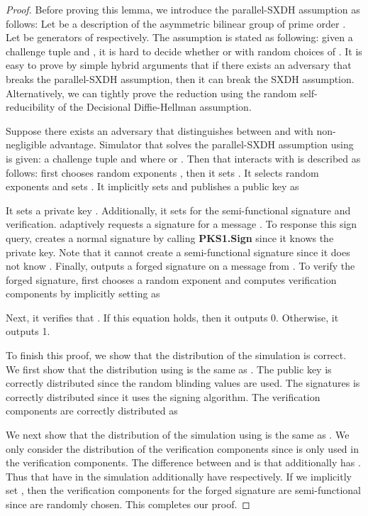 \documentclass[11pt,letterpaper]{article}
\newcommand{\vs}{\vspace{1.5mm}}
\begin{document}
\begin{proof}
Before proving this lemma, we introduce the parallel-SXDH assumption as
follows: Let  be a description of the asymmetric
bilinear group of prime order . Let  be generators of  respectively. The assumption is stated as following: given a
challenge tuple
     and ,
it is hard to decide whether  or  with random choices of . It is easy to prove by simple hybrid arguments that if there
exists an adversary that breaks the parallel-SXDH assumption, then it can
break the SXDH assumption. Alternatively, we can tightly prove the reduction
using the random self-reducibility of the Decisional Diffie-Hellman
assumption.

Suppose there exists an adversary  that distinguishes between
 and  with non-negligible advantage. Simulator 
that solves the parallel-SXDH assumption using  is given: a challenge
tuple
     and
     where
     or
    .
Then  that interacts with  is described as follows:
 first chooses random exponents , then it sets .
It selects random exponents  and sets
    .
It implicitly sets  and publishes a
public key  as
    
It sets a private key . Additionally, it sets  for the semi-functional signature and verification. 
adaptively requests a signature for a message . To response this sign
query,  creates a normal signature by calling \textbf{PKS1.Sign}
since it knows the private key. Note that it cannot create a semi-functional
signature since it does not know . Finally,  outputs a forged
signature  on a message  from
. To verify the forged signature,  first chooses a random
exponent  and computes verification components by implicitly
setting  as
    
Next, it verifies that
    .
If this equation holds, then it outputs 0. Otherwise, it outputs 1.

\vs To finish this proof, we show that the distribution of the simulation is
correct. We first show that the distribution using  is the same as . The public key
is correctly distributed since the random blinding values  are
used. The signatures is correctly distributed since it uses the signing
algorithm. The verification components are correctly distributed as
    
We next show that the distribution of the simulation using  is the same as
. We only consider the distribution of the verification components
since  is only used in the verification components. The difference between
 and  is that  additionally has . Thus  that have  in the simulation
additionally have  respectively. If we
implicitly set , then the verification
components for the forged signature are semi-functional since  are
randomly chosen.
This completes our proof.
\end{proof}
\end{document}
